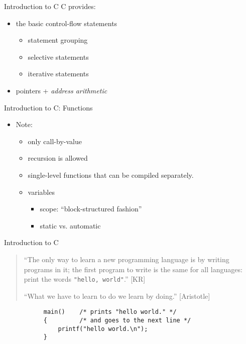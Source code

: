 \begin{frame}[fragile]{Introduction to C}
C provides:
\begin{itemize}
\item the basic control-flow statements
    \begin{itemize} \item statement grouping
                    \item selective statements
                    \item iterative statements
    \end{itemize}
\item pointers + {\em address arithmetic}
\end{itemize}

\end{frame}
\begin{frame}[fragile]{Introduction to C: Functions}
\begin{itemize}
\item Note:
     \begin{itemize}\item only call-by-value
                    \item recursion is allowed
                    \item single-level functions
                      that can be compiled separately.
                    \item variables
                      \begin{itemize} \item scope:
                                        ``blo\-ck-stru\-ctu\-red fashion''
			\item static vs. automatic
                      \end{itemize}
     \end{itemize}
\end{itemize}


\end{frame}
\begin{frame}[fragile]{Introduction to C}
\begin{verse}
 ``The only way to learn a new programming language is by writing
   programs in it; the first program to write is the same for all
   languages: print the words \texttt{"hello, world"}.'' [KR]

 ``What we have to learn to do we learn by doing.'' [Aristotle]
\end{verse}


\vspace{20pt}

\begin{verbatim}
           main()    /* prints "hello world." */
           {         /* and goes to the next line */
               printf("hello world.\n");
           }
\end{verbatim}

\end{frame}

